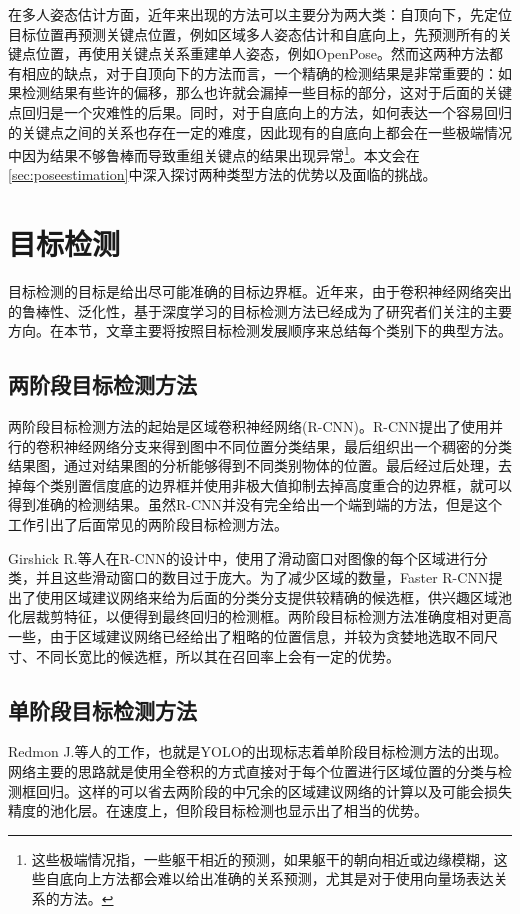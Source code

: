 在多人姿态估计方面，近年来出现的方法可以主要分为两大类：自顶向下，先定位目标位置再预测关键点位置，例如区域多人姿态估计\cite{fang2017rmpe}和自底向上，先预测所有的关键点位置，再使用关键点关系重建单人姿态，例如OpenPose\cite{Cao2016Realtime}。然而这两种方法都有相应的缺点，对于自顶向下的方法而言，一个精确的检测结果是非常重要的：如果检测结果有些许的偏移，那么也许就会漏掉一些目标的部分，这对于后面的关键点回归是一个灾难性的后果。同时，对于自底向上的方法，如何表达一个容易回归的关键点之间的关系也存在一定的难度，因此现有的自底向上都会在一些极端情况中因为结果不够鲁棒而导致重组关键点的结果出现异常\footnote{这些极端情况指，一些躯干相近的预测，如果躯干的朝向相近或边缘模糊，这些自底向上方法都会难以给出准确的关系预测，尤其是对于使用向量场表达关系的方法。}。本文会在\ref{sec:poseestimation}中深入探讨两种类型方法的优势以及面临的挑战。

\section{目标检测}
\label{sec:detect}
目标检测的目标是给出尽可能准确的目标边界框。近年来，由于卷积神经网络突出的鲁棒性、泛化性，基于深度学习的目标检测方法已经成为了研究者们关注的主要方向。在本节，文章主要将按照目标检测发展顺序来总结每个类别下的典型方法。
\subsection{两阶段目标检测方法}
\label{2stagedetector}
两阶段目标检测方法的起始是区域卷积神经网络(R-CNN)\cite{Girshick_2014_CVPR}。R-CNN提出了使用并行的卷积神经网络分支来得到图中不同位置分类结果，最后组织出一个稠密的分类结果图，通过对结果图的分析能够得到不同类别物体的位置。最后经过后处理，去掉每个类别置信度底的边界框并使用非极大值抑制去掉高度重合的边界框，就可以得到准确的检测结果。虽然R-CNN并没有完全给出一个端到端的方法，但是这个工作引出了后面常见的两阶段目标检测方法。

Girshick R.等人在R-CNN的设计中，使用了滑动窗口对图像的每个区域进行分类，并且这些滑动窗口的数目过于庞大。为了减少区域的数量，Faster R-CNN\cite{Ren2015Faster}提出了使用区域建议网络来给为后面的分类分支提供较精确的候选框，供兴趣区域池化层裁剪特征，以便得到最终回归的检测框。两阶段目标检测方法准确度相对更高一些，由于区域建议网络已经给出了粗略的位置信息，并较为贪婪地选取不同尺寸、不同长宽比的候选框，所以其在召回率上会有一定的优势。

\subsection{单阶段目标检测方法}
\label{subsec:1stagedetector}
Redmon J.\cite{redmon2016you}等人的工作，也就是YOLO的出现标志着单阶段目标检测方法的出现。网络主要的思路就是使用全卷积的方式直接对于每个位置进行区域位置的分类与检测框回归。这样的可以省去两阶段的中冗余的区域建议网络的计算以及可能会损失精度的池化层。在速度上，但阶段目标检测也显示出了相当的优势。

